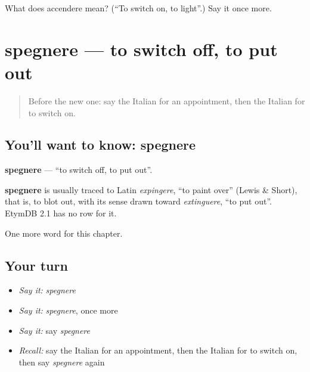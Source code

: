 \begin{tcolorbox}[breakable,colback=teal!4,colframe=teal!35!black,title={Before you move on}]
What does accendere mean? (\textquotedblleft{}To switch on, to light\textquotedblright{}.) Say it once more.
\end{tcolorbox}
\section[spegnere]{spegnere — to switch off, to put out}

\label{lesson:IT-C140-spegnere}



\begin{quote}
Before the new one: say the Italian for an appointment, then the Italian for to switch on.
\end{quote}

\subsection*{You'll want to know: spegnere}
\textbf{spegnere} — \textquotedblleft{}to switch off, to put out\textquotedblright{}.

\begin{cousinweb}
\textbf{spegnere} is usually traced to Latin \emph{expingere}, \textquotedblleft{}to paint over\textquotedblright{} (Lewis \& Short), that is, to blot out, with its sense drawn toward \emph{extinguere}, \textquotedblleft{}to put out\textquotedblright{}. EtymDB 2.1 has no row for it.
\end{cousinweb}

\begin{grammarlens}[title={What you've built}]
One more word for this chapter.
\end{grammarlens}

\subsection*{Your turn}
\begin{itemize}
\raggedright
  \item \emph{Say it:} \emph{spegnere}
  \item \emph{Say it:} \emph{spegnere}, once more
  \item \emph{Say it:} say \emph{spegnere}
  \item \emph{Recall:} say the Italian for an appointment, then the Italian for to switch on, then say \emph{spegnere} again
\end{itemize}

